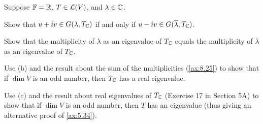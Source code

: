 \begin{exercise}
Suppose $\mathbb{F}=\mathbb{R}$, $T\in\mathcal{L}(V)$, and $\lambda\in\mathbb{C}$.
\begin{parts}
\item Show that $u+iv\in G(\lambda,T_{\mathbb{C}})$ if and only if
  $u-iv\in G(\overline{\lambda},T_{\mathbb{C}})$.
\item Show that the multiplicity of $\lambda$ as an eigenvalue of $T_{\mathbb{C}}$
  equals the multiplicity of $\overline{\lambda}$ as an eigenvalue of
  $T_{\mathbb{C}}$.
\item Use (b) and the result about the sum of the multiplicities
  (\ref{ax:8.25}) to show that if $\dim V$ is an odd number, then $T_{\mathbb{C}}$ has
  a real eigenvalue.
\item Use (c) and the result about real eigenvalues of $T_{\mathbb{C}}$ (Exercise 17 in
  Section 5A) to show that if $\dim V$ is an odd number, then $T$ has an
  eigenvalue (thus giving an alternative proof of \ref{ax:5.34}).
\end{parts}
\end{exercise}
